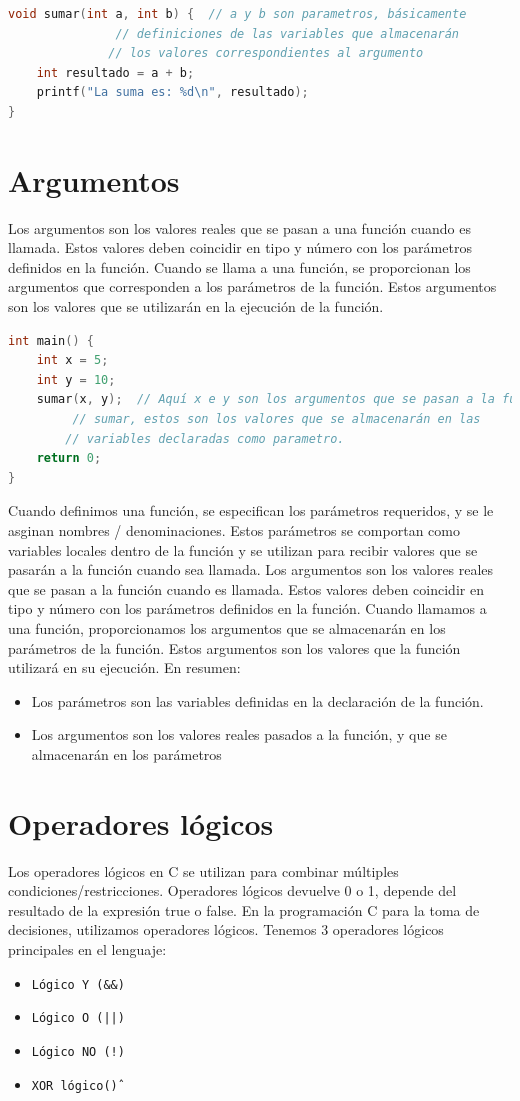 \documentclass{article}
\begin{document}
\begin{lstlisting}[style=mystyle, language=C]
void sumar(int a, int b) {  // a y b son parametros, básicamente
			   // definiciones de las variables que almacenarán
			  // los valores correspondientes al argumento
    int resultado = a + b;
    printf("La suma es: %d\n", resultado);
}
\end{lstlisting}
\section{Argumentos}
Los argumentos son los valores reales que se pasan a una función cuando es llamada. Estos valores deben coincidir en tipo y número con los parámetros definidos en la función. Cuando se llama a una función, se proporcionan los argumentos que corresponden a los parámetros de la función. Estos argumentos son los valores que se utilizarán en la ejecución de la función.
\begin{lstlisting}[style=mystyle, language=C]
int main() {
    int x = 5;
    int y = 10;
    sumar(x, y);  // Aquí x e y son los argumentos que se pasan a la función
		 // sumar, estos son los valores que se almacenarán en las
		// variables declaradas como parametro.
    return 0;
}
\end{lstlisting}
Cuando definimos una función, se especifican los parámetros requeridos, y se le asginan nombres / denominaciones. Estos parámetros se comportan como variables locales dentro de la función y se utilizan para recibir valores que se pasarán a la función cuando sea llamada. Los argumentos son los valores reales que se pasan a la función cuando es llamada. Estos valores deben coincidir en tipo y número con los parámetros definidos en la función. Cuando llamamos a una función, proporcionamos los argumentos que se almacenarán en los parámetros de la función. Estos argumentos son los valores que la función utilizará en su ejecución. En resumen:\\
\begin{itemize}
    \item Los parámetros son las variables definidas en la declaración de la función.
    \item Los argumentos son los valores reales pasados a la función, y que se almacenarán en los parámetros
\end{itemize}
\section{Operadores lógicos}
Los operadores lógicos en C se utilizan para combinar múltiples condiciones/restricciones. Operadores lógicos devuelve 0 o 1, depende del resultado de la expresión true o false. En la programación C para la toma de decisiones, utilizamos operadores lógicos. Tenemos 3 operadores lógicos principales en el lenguaje:
\begin{itemize}
    \item \texttt{Lógico Y (\&\&)}
    \item \texttt{Lógico O (||)}
    \item \texttt{Lógico NO (!)}
    \item \texttt{XOR lógico(\^)}
\end{itemize}
\end{document}
